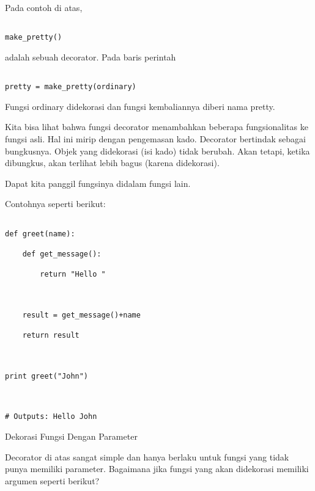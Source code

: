 \documentclass[12pt,a4paper]{article}
\begin{document}
Pada contoh di atas, 

\begin{verbatim}

make_pretty()

\end{verbatim}  

adalah sebuah decorator. Pada baris perintah 



\begin{verbatim}

pretty = make_pretty(ordinary)

\end{verbatim}



Fungsi ordinary didekorasi dan fungsi kembaliannya diberi nama pretty.

Kita bisa lihat bahwa fungsi decorator menambahkan beberapa fungsionalitas ke fungsi asli. Hal ini mirip dengan pengemasan kado. Decorator bertindak sebagai bungkusnya. Objek yang didekorasi (isi kado) tidak berubah. Akan tetapi, ketika dibungkus, akan terlihat lebih bagus (karena didekorasi).



Dapat kita panggil fungsinya didalam fungsi lain.

Contohnya seperti berikut:



\begin{verbatim}

def greet(name):

    def get_message():

        return "Hello "



    result = get_message()+name

    return result



print greet("John")



# Outputs: Hello John

\end{verbatim}





Dekorasi Fungsi Dengan Parameter



Decorator di atas sangat simple dan hanya berlaku untuk fungsi yang tidak punya memiliki parameter. Bagaimana jika fungsi yang akan didekorasi memiliki argumen seperti berikut?
\end{document}
